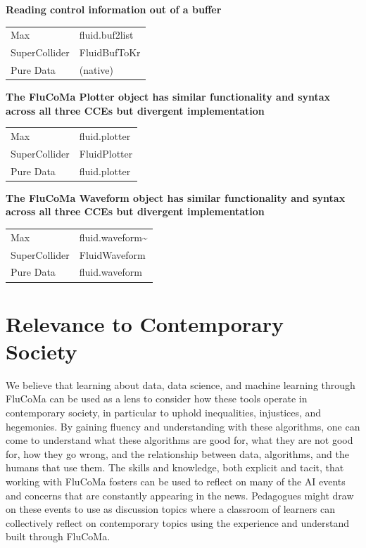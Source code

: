 \documentclass{article}
\begin{document}
\textbf{Reading control information out of a buffer}

\begin{longtable}{ll}
\toprule
Max & fluid.buf2list \\
SuperCollider & FluidBufToKr \\
Pure Data & (native) \\
\bottomrule
\end{longtable}

\textbf{The FluCoMa Plotter object has similar functionality and syntax
across all three CCEs but divergent implementation}

\begin{longtable}{ll}
\toprule
Max & fluid.plotter \\
SuperCollider & FluidPlotter \\
Pure Data & fluid.plotter \\
\bottomrule
\end{longtable}

\textbf{The FluCoMa Waveform object has similar functionality and syntax
across all three CCEs but divergent implementation}

\begin{longtable}{ll}
\toprule
Max & fluid.waveform\textasciitilde{} \\
SuperCollider & FluidWaveform \\
Pure Data & fluid.waveform \\
\bottomrule
\end{longtable}

\section{Relevance to Contemporary
Society}\label{relevance-to-contemporary-society}

We believe that learning about data, data science, and machine learning
through FluCoMa can be used as a lens to consider how these tools
operate in contemporary society, in particular to uphold inequalities,
injustices, and hegemonies. By gaining fluency and understanding with
these algorithms, one can come to understand what these algorithms are
good for, what they are not good for, how they go wrong, and the
relationship between data, algorithms, and the humans that use them. The
skills and knowledge, both explicit and tacit, that working with FluCoMa
fosters can be used to reflect on many of the AI events and concerns
that are constantly appearing in the news. Pedagogues might draw on
these events to use as discussion topics where a classroom of learners
can collectively reflect on contemporary topics using the experience and
understand built through FluCoMa.
\end{document}
